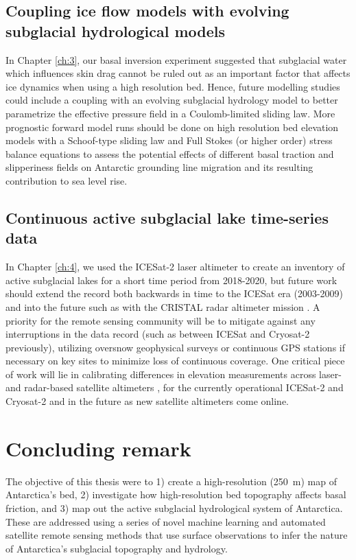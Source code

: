 \subsection{Coupling ice flow models with evolving subglacial hydrological models}

In Chapter \ref{ch:3}, our basal inversion experiment suggested that subglacial water which influences skin drag cannot be ruled out as an important factor that affects ice dynamics when using a high resolution bed.
Hence, future modelling studies could include a coupling with an evolving subglacial hydrology model \citep[e.g.][]{SommersSHAKTISubglacialHydrology2018} to better parametrize the effective pressure field in a Coulomb-limited sliding law.
More prognostic forward model runs should be done on high resolution bed elevation models with a Schoof-type sliding law and Full Stokes (or higher order) stress balance equations to assess the potential effects of different basal traction and slipperiness fields on Antarctic grounding line migration and its resulting contribution to sea level rise.

\subsection{Continuous active subglacial lake time-series data}

In Chapter \ref{ch:4}, we used the ICESat-2 laser altimeter to create an inventory of active subglacial lakes for a short time period from 2018-2020, but future work should extend the record both backwards in time to the ICESat era (2003-2009) and into the future such as with the CRISTAL radar altimeter mission \citep{KernCopernicusPolarIce2020}.
A priority for the remote sensing community will be to mitigate against any interruptions in the data record (such as between ICESat and Cryosat-2 previously), utilizing oversnow geophysical surveys or continuous GPS stations if necessary on key sites to minimize loss of continuous coverage.
One critical piece of work will lie in calibrating differences in elevation measurements across laser- and radar-based satellite altimeters \citep[c.f.][]{SiegfriedThirteenyearssubglacial2018}, for the currently operational ICESat-2 and Cryosat-2 \citep{BruntComparisonsSatelliteAirborne2020} and in the future as new satellite altimeters come online.

\section{Concluding remark}

The objective of this thesis were to 1) create a high-resolution (\SI{250}{\metre}) map of Antarctica's bed, 2) investigate how high-resolution bed topography affects basal friction, and 3) map out the active subglacial hydrological system of Antarctica.
These are addressed using a series of novel machine learning and automated satellite remote sensing methods that use surface observations to infer the nature of Antarctica's subglacial topography and hydrology.
